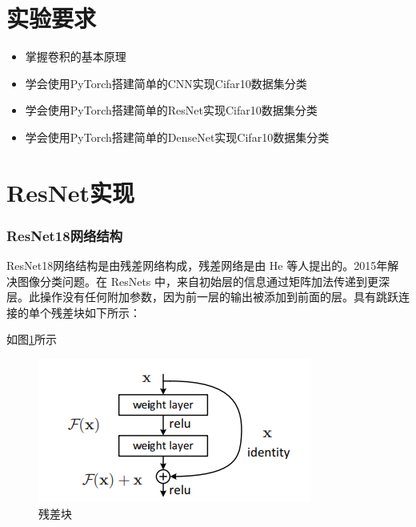\documentclass[UTF8,a4paper,10pt]{ctexart}
\begin{document}
\section{实验要求}

\begin{itemize}
    \item 掌握卷积的基本原理
    \item 学会使用PyTorch搭建简单的CNN实现Cifar10数据集分类
    \item 学会使用PyTorch搭建简单的ResNet实现Cifar10数据集分类
    \item 学会使用PyTorch搭建简单的DenseNet实现Cifar10数据集分类
\end{itemize}

\section{ResNet实现}

\subsubsection{ResNet18网络结构}

ResNet18网络结构是由残差网络构成，残差网络是由 He 等人提出的。2015年解决图像分类问题。在 ResNets 中，来自初始层的信息通过矩阵加法传递到更深层。此操作没有任何附加参数，因为前一层的输出被添加到前面的层。具有跳跃连接的单个残差块如下所示：

如图\ref{fig:1}所示
\begin{figure}[H]
    \centering
    \includegraphics[scale=0.7]{2.png}
    \caption{残差块}
    \label{fig:1}
\end{figure}
\end{document}
